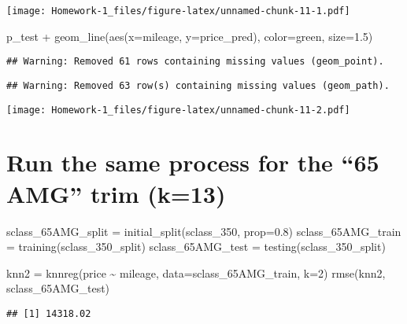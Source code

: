 \documentclass[
]{article}
\newenvironment{Shaded}{\begin{snugshade}}{\end{snugshade}}
\newcommand{\AttributeTok}[1]{\textcolor[rgb]{0.77,0.63,0.00}{#1}}
\newcommand{\DecValTok}[1]{\textcolor[rgb]{0.00,0.00,0.81}{#1}}
\newcommand{\FloatTok}[1]{\textcolor[rgb]{0.00,0.00,0.81}{#1}}
\newcommand{\FunctionTok}[1]{\textcolor[rgb]{0.00,0.00,0.00}{#1}}
\newcommand{\NormalTok}[1]{#1}
\newcommand{\OtherTok}[1]{\textcolor[rgb]{0.56,0.35,0.01}{#1}}
\newcommand{\SpecialCharTok}[1]{\textcolor[rgb]{0.00,0.00,0.00}{#1}}
\newcommand{\StringTok}[1]{\textcolor[rgb]{0.31,0.60,0.02}{#1}}
\begin{document}
\texttt{[image: Homework-1\_files/figure-latex/unnamed-chunk-11-1.pdf]}

\begin{Shaded}
\begin{Highlighting}[]
\NormalTok{p\_test }\SpecialCharTok{+} \FunctionTok{geom\_line}\NormalTok{(}\FunctionTok{aes}\NormalTok{(}\AttributeTok{x=}\NormalTok{mileage, }\AttributeTok{y=}\NormalTok{price\_pred), }\AttributeTok{color=}\StringTok{\textquotesingle{}green\textquotesingle{}}\NormalTok{, }\AttributeTok{size=}\FloatTok{1.5}\NormalTok{)}
\end{Highlighting}
\end{Shaded}

\begin{verbatim}
## Warning: Removed 61 rows containing missing values (geom_point).
\end{verbatim}

\begin{verbatim}
## Warning: Removed 63 row(s) containing missing values (geom_path).
\end{verbatim}

\texttt{[image: Homework-1\_files/figure-latex/unnamed-chunk-11-2.pdf]}

\hypertarget{run-the-same-process-for-the-65-amg-trim-k13}{%
\section{Run the same process for the ``65 AMG'' trim
(k=13)}\label{run-the-same-process-for-the-65-amg-trim-k13}}

\begin{Shaded}
\begin{Highlighting}[]
\NormalTok{sclass\_65AMG\_split }\OtherTok{=} \FunctionTok{initial\_split}\NormalTok{(sclass\_350, }\AttributeTok{prop=}\FloatTok{0.8}\NormalTok{)}
\NormalTok{sclass\_65AMG\_train }\OtherTok{=} \FunctionTok{training}\NormalTok{(sclass\_350\_split)}
\NormalTok{sclass\_65AMG\_test }\OtherTok{=} \FunctionTok{testing}\NormalTok{(sclass\_350\_split)}

\NormalTok{knn2 }\OtherTok{=} \FunctionTok{knnreg}\NormalTok{(price }\SpecialCharTok{\textasciitilde{}}\NormalTok{ mileage, }\AttributeTok{data=}\NormalTok{sclass\_65AMG\_train, }\AttributeTok{k=}\DecValTok{2}\NormalTok{)}
\FunctionTok{rmse}\NormalTok{(knn2, sclass\_65AMG\_test)}
\end{Highlighting}
\end{Shaded}

\begin{verbatim}
## [1] 14318.02
\end{verbatim}
\end{document}
